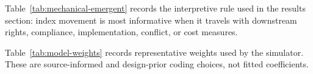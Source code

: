 \documentclass[11pt]{article}
\begin{document}
\clearpage
Table~\ref{tab:mechanical-emergent} records the interpretive rule used in the results section: index movement is most informative when it travels with downstream rights, compliance, implementation, conflict, or cost measures.


\clearpage
Table~\ref{tab:model-weights} records representative weights used by the simulator. These are source-informed and design-prior coding choices, not fitted coefficients.


\clearpage
\end{document}
